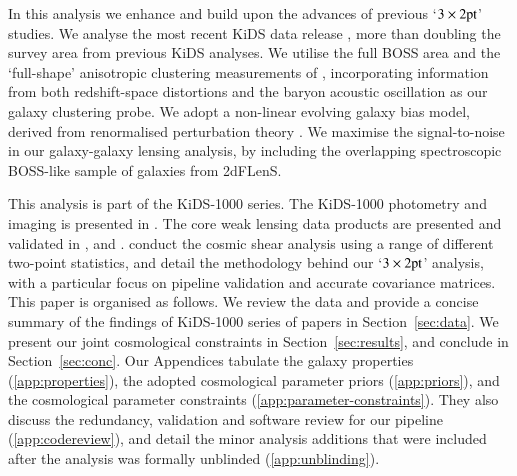    In this analysis we enhance and build upon the advances of previous `$3\times
   2{\rm pt}$' studies.   We analyse the most recent KiDS data release \citep[KiDS-1000,][]{kuijken/etal:2019}, more than doubling the
   survey area from previous KiDS analyses.   We utilise the full BOSS
   area and the `full-shape' anisotropic clustering measurements of \citet{sanchez/etal:2017},
   incorporating information from both redshift-space distortions
   and the baryon acoustic oscillation as our galaxy clustering probe.   We adopt a non-linear
   evolving galaxy bias model, derived from renormalised perturbation theory
   \citep{crocce/scoccimarro:2006, chan/etal:2012}.   We maximise the signal-to-noise in our galaxy-galaxy lensing analysis, 
   by including the overlapping spectroscopic BOSS-like sample of galaxies from 2dFLenS.

This analysis is part of the KiDS-1000 series.  The KiDS-1000 photometry and imaging is presented in \citet{kuijken/etal:2019}.  The core weak lensing data products are presented and validated in \citet[shear measurements,][]{giblin/etal:inprep},  and  \citet[redshift measurements,][]{hildebrandt/etal:inprep}.   \citet{asgari/etal:inprep} conduct the cosmic shear analysis using a range of different two-point statistics, and \citet{joachimi/etal:inprep} detail the methodology behind our `$3\times
   2{\rm pt}$'  analysis, with a particular focus on pipeline validation and accurate covariance matrices.   This paper is organised as follows.   We review the data and provide a concise summary of the findings of KiDS-1000 series of papers in Section~\ref{sec:data}.   We present our joint cosmological constraints in Section~\ref{sec:results}, and conclude in Section~\ref{sec:conc}.  Our Appendices tabulate the galaxy properties (\ref{app:properties}), the adopted cosmological parameter priors (\ref{app:priors}),  and the cosmological parameter constraints (\ref{app:parameter-constraints}).   They also discuss the redundancy, validation and software review for our pipeline (\ref{app:codereview}), and detail the minor analysis additions that were included after the analysis was formally unblinded (\ref{app:unblinding}).


   











   